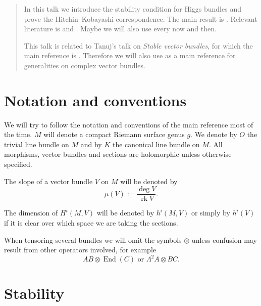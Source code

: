 \documentclass[A4paper, 12pt, british, reqno]{amsart}
\DeclareMathOperator{\End}{End}
\DeclareMathOperator{\rk}{rk}
\newcommand{\ot}{\otimes}
\begin{document}
\maketitle

\begin{abstract}
    In this talk we introduce the stability condition for Higgs bundles and prove the Hitchin--Kobayashi correspondence.
    The main result is \cite[Theorem 4.3]{hit87}.
    Relevant literature is \cite[\S 3 and \S 4]{hit87} and \cite[\S 2 and \S 3]{wen14}.
    Maybe we will also use \cite{wen16} every now and then.

    This talk is related to Tanuj's talk on \textit{Stable vector bundles}, for which the main reference is \cite{kob87}.
    Therefore we will also use \cite{kob87} as a main reference for generalities on complex vector bundles.
\end{abstract}

\tableofcontents

\section*{Notation and conventions}

We will try to follow the notation and conventions of the main reference \cite{hit87} most of the time.
$M$ will denote a compact Riemann surface genus $g$.
We denote by $O$ the trivial line bundle on $M$ and by $K$ the canonical line bundle on $M$.
All morphisms, vector bundles and sections are holomorphic unless otherwise specified.

The slope of a vector bundle $V$ on $M$ will be denoted by
\[ \mu(V):=\frac{\deg{V}}{\rk{V}}. \]

The dimension of $H^{i}(M,V)$ will be denoted by $h^{i}(M,V)$ or simply by $h^{i}(V)$ if it is clear over which space we are taking the sections.

When tensoring several bundles we will omit the symbols $\ot$ unless confusion may result from other operators involved, for example
\[ AB\ot \End(C) \text{ or } \Lambda^{2}A\ot BC. \]

\section{Stability}

\end{document}
